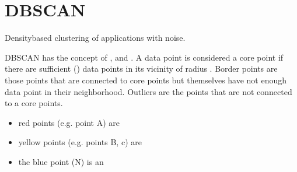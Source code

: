 \documentclass[letterpaper,10pt,english]{jupyterBook}
\begin{document}
\begin{sphinxVerbatim}[commandchars=\\\{\}]
\PYG{p}{[}\PYG{p}{]} \PYG{p}{[}\PYG{p}{]}
\PYG{p}{[}\PYG{p}{]}  \PYG{p}{[}\PYG{p}{[}\PYG{p}{]}\PYG{p}{]}   
\end{sphinxVerbatim}


\chapter{DBSCAN}
\label{\detokenize{Text_Clustering:dbscan}}
\sphinxAtStartPar
Density\sphinxhyphen{}based clustering of applications with noise.

\sphinxAtStartPar
DBSCAN has the concept of ,  and . A data point is considered a core point if there are sufficient () data points in its vicinity of radius . Border points are those points that are connected to core points but themselves have not enough data point in their neighborhood. Outliers are the points that are not connected to a core points.

\noindent{}

\sphinxAtStartPar
{}
\begin{itemize}
\item {} 
\sphinxAtStartPar
red points (e.g. point A) are 

\item {} 
\sphinxAtStartPar
yellow points (e.g. points B, c) are 

\item {} 
\sphinxAtStartPar
the blue point (N) is an 

\end{itemize}
\end{document}
